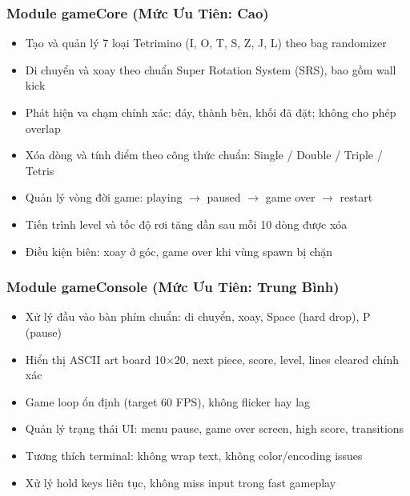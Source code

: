 \documentclass[12pt,a4paper]{article}
\begin{document}
\subsubsection{Module gameCore \textnormal{(Mức Ưu Tiên: Cao)}}
\begin{itemize}[leftmargin=3em]
  \item Tạo và quản lý 7 loại Tetrimino (I, O, T, S, Z, J, L) theo bag randomizer
  \item Di chuyển và xoay theo chuẩn Super Rotation System (SRS), bao gồm wall kick
  \item Phát hiện va chạm chính xác: đáy, thành bên, khối đã đặt; không cho phép overlap
  \item Xóa dòng và tính điểm theo công thức chuẩn: Single / Double / Triple / Tetris
  \item Quản lý vòng đời game: playing $\rightarrow$ paused $\rightarrow$ game over $\rightarrow$ restart
  \item Tiến trình level và tốc độ rơi tăng dần sau mỗi 10 dòng được xóa
  \item Điều kiện biên: xoay ở góc, game over khi vùng spawn bị chặn
\end{itemize}

\subsubsection{Module gameConsole \textnormal{(Mức Ưu Tiên: Trung Bình)}}
\begin{itemize}[leftmargin=3em]
  \item Xử lý đầu vào bàn phím chuẩn: di chuyển, xoay, Space (hard drop), P (pause)
  \item Hiển thị ASCII art board 10$\times$20, next piece, score, level, lines cleared chính xác
  \item Game loop ổn định (target 60 FPS), không flicker hay lag
  \item Quản lý trạng thái UI: menu pause, game over screen, high score, transitions
  \item Tương thích terminal: không wrap text, không color/encoding issues
  \item Xử lý hold keys liên tục, không miss input trong fast gameplay
\end{itemize}
\end{document}
